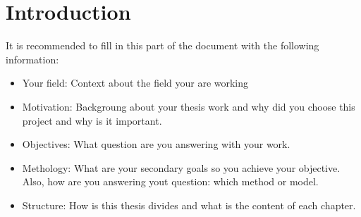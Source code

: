 
\chapter*{Introduction}
\label{chapter:intro}


 It is recommended to fill in this part of the document with the following information:

\begin{itemize}
	\item Your field: Context about the field your are working
	\item Motivation: Backgroung about your thesis work and why did you choose this project and why is it important.
	\item Objectives: What question are you answering with your work.
	\item Methology: What are your secondary goals so you achieve your objective. Also, how are you answering yout question: which method or model.
	\item Structure: How is this thesis divides and what is the content of each chapter.
\end{itemize}

\Blindtext